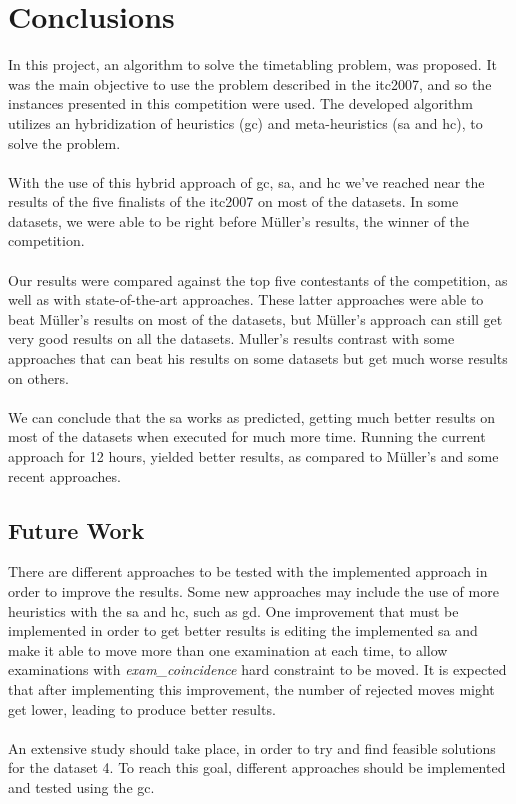\chapter{Conclusions}
\label{chap:FutureWork}

In this project, an algorithm to solve the timetabling problem, was proposed. It was the main objective to use the problem described in the \gls{itc2007}, and so the instances presented in this competition were used. The developed algorithm utilizes an hybridization of heuristics (\gls{gc}) and meta-heuristics (\gls{sa} and \gls{hc}), to solve the problem.\\
\\
With the use of this hybrid approach of \gls{gc}, \gls{sa}, and \gls{hc} we've reached near the results of the five finalists of the \gls{itc2007} on most of the datasets. In some datasets, we were able to be right before M\"{u}ller's results, the winner of the competition.\\
\\
Our results were compared against the top five contestants of the competition, as well as with state-of-the-art approaches. These latter approaches were able to beat M\"{u}ller's results on most of the datasets, but M\"{u}ller's approach can still get very good results on all the datasets. Muller's results contrast with some approaches that can beat his results on some datasets but get much worse results on others.\\
\\
We can conclude that the \gls{sa} works as predicted, getting much better results on most of the datasets when executed for much more time. Running the current approach for 12 hours, yielded better results, as compared to M\"{u}ller's and some recent approaches.\\
\section{Future Work}
There are different approaches to be tested with the implemented approach in order to improve the results. Some new approaches may include the use of more heuristics with the \gls{sa} and \gls{hc}, such as \gls{gd}. One improvement that must be implemented in order to get better results is editing the implemented \gls{sa} and make it able to move more than one examination at each time, to allow examinations with \textit{exam\_coincidence} hard constraint to be moved. It is expected that after implementing this improvement, the number of rejected moves might get lower, leading to produce better results.\\
\\
An extensive study should take place, in order to try and find feasible solutions for the dataset 4. To reach this goal, different approaches should be implemented and tested using the \gls{gc}.